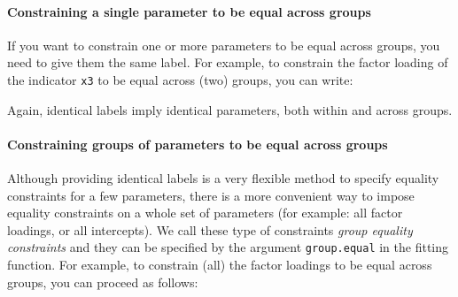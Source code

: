 \begin{Shaded}
\begin{Highlighting}[]
\OtherTok{=}\ErrorTok{\textasciitilde{}}\SpecialCharTok{+} \NormalTok{(}\NormalTok{,}\NormalTok{,}\NormalTok{,}\NormalTok{)}\SpecialCharTok{*}\SpecialCharTok{+}
\end{Highlighting}
\end{Shaded}

\hypertarget{constraining-a-single-parameter-to-be-equal-across-groups}{%
\paragraph{Constraining a single parameter to be equal across
groups}\label{constraining-a-single-parameter-to-be-equal-across-groups}}

If you want to constrain one or more parameters to be equal across
groups, you need to give them the same label. For example, to constrain
the factor loading of the indicator \texttt{x3} to be equal across (two)
groups, you can write:

\begin{Shaded}
\begin{Highlighting}[]
\OtherTok{\textless{}{-}} 
\end{Highlighting}
\end{Shaded}

Again, identical labels imply identical parameters, both within and
across groups.

\hypertarget{constraining-groups-of-parameters-to-be-equal-across-groups}{%
\paragraph{Constraining groups of parameters to be equal across
groups}\label{constraining-groups-of-parameters-to-be-equal-across-groups}}

Although providing identical labels is a very flexible method to specify
equality constraints for a few parameters, there is a more convenient
way to impose equality constraints on a whole set of parameters (for
example: all factor loadings, or all intercepts). We call these type of
constraints \emph{group equality constraints} and they can be specified
by the argument \texttt{group.equal} in the fitting function. For
example, to constrain (all) the factor loadings to be equal across
groups, you can proceed as follows:

